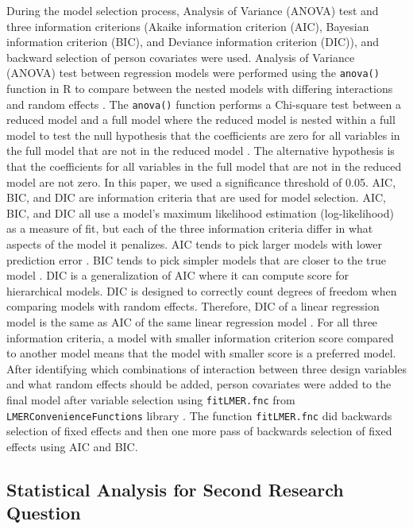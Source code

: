 \documentclass{article}
\begin{document}
During the model selection process, Analysis of Variance (ANOVA) test and three information criterions (Akaike information criterion (AIC), Bayesian information criterion (BIC), and Deviance information criterion (DIC)), and backward selection of person covariates were used. Analysis of Variance (ANOVA) test between regression models were performed using the \texttt{anova()} function in R to compare between the nested models with differing interactions and random effects \parencite{r}. The \texttt{anova()} function performs a Chi-square test between a reduced model and a full model where the reduced model is nested within a full model to test the null hypothesis that the coefficients are zero for all variables in the full model that are not in the reduced model \parencite{stack-1}. The alternative hypothesis is that the coefficients for all variables in the full model that are not in the reduced model are not zero. In this paper, we used a significance threshold of 0.05. AIC, BIC, and DIC are information criteria that are used for model selection. AIC, BIC, and DIC all use a model's maximum likelihood estimation (log-likelihood) as a measure of fit, but each of the three information criteria differ in what aspects of the model it penalizes. AIC tends to pick larger models with lower prediction error \parencite[]{lecture-22}. BIC tends to pick simpler models that are closer to the true model \parencite[]{lecture-22}. DIC is a generalization of AIC where it can compute score for hierarchical models. DIC is designed to correctly count degrees of freedom when comparing models with random effects. Therefore, DIC of a linear regression model is the same as AIC of the same linear regression model \parencite[]{lecture-22}. For all three information criteria, a model with smaller information criterion score compared to another model means that the model with smaller score is a preferred model. After identifying which combinations of interaction between three design variables and what random effects should be added, person covariates were added to the final model after variable selection using \texttt{fitLMER.fnc} from \texttt{LMERConvenienceFunctions} library \parencite{LMERConvenienceFunctions}. The function \texttt{fitLMER.fnc} did backwards selection of fixed effects and then one more pass of backwards selection of fixed effects using AIC and BIC.

\subsection{Statistical Analysis for Second Research Question}
\end{document}
